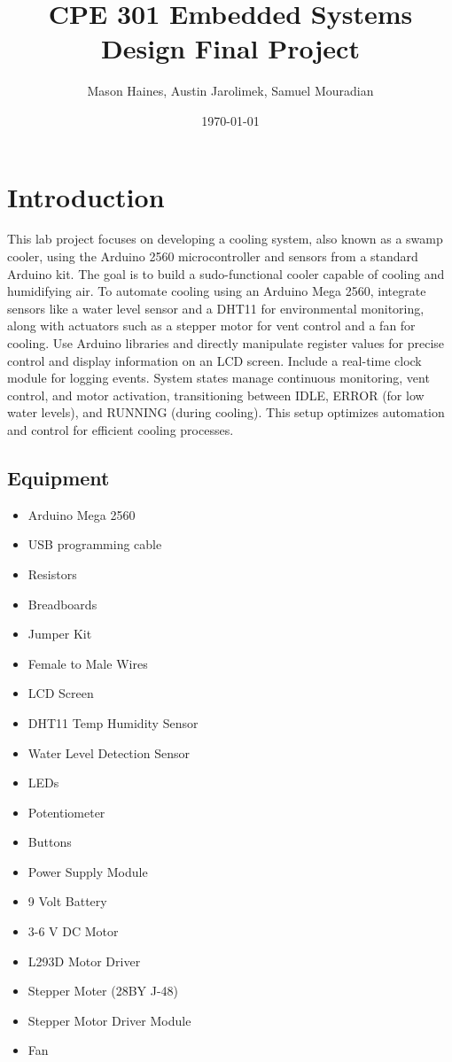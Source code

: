 \documentclass{article}
\title{CPE 301 Embedded Systems Design Final Project}
\author{Mason Haines, Austin Jarolimek, Samuel Mouradian }
\date{\today}
\begin{document}
\maketitle


\section{Introduction}
This lab project focuses on developing a cooling system, also known as a swamp cooler, using the Arduino 2560 microcontroller and sensors from a standard Arduino kit. The goal is to build a sudo-functional cooler capable of cooling and humidifying air. To automate cooling using an Arduino Mega 2560, integrate sensors like a water level sensor and a DHT11 for environmental monitoring, along with actuators such as a stepper motor for vent control and a fan for cooling. Use Arduino libraries and directly manipulate register values for precise control and display information on an LCD screen. Include a real-time clock module for logging events. System states manage continuous monitoring, vent control, and motor activation, transitioning between IDLE, ERROR (for low water levels), and RUNNING (during cooling). This setup optimizes automation and control for efficient cooling processes.


\subsection{Equipment}
\begin{itemize}
    \item Arduino Mega 2560
    \item USB programming cable
    \item Resistors
    \item Breadboards
    \item Jumper Kit
    \item Female to Male Wires
    \item LCD Screen
    \item DHT11 Temp Humidity Sensor
    \item Water Level Detection Sensor
    \item LEDs
    \item Potentiometer
    \item Buttons
    \item Power Supply Module
    \item 9 Volt Battery
    \item 3-6 V DC Motor
    \item L293D Motor Driver
    \item Stepper Moter (28BY J-48)
    \item Stepper Motor Driver Module
    \item Fan

\end{itemize}
\end{document}

